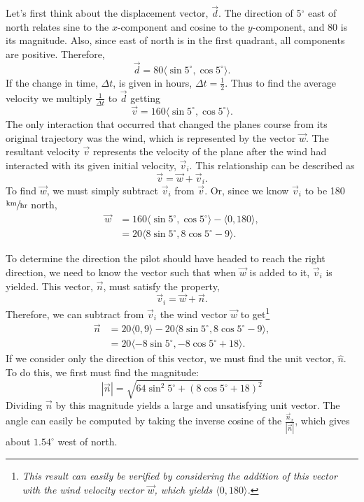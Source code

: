 \documentclass{article}
\begin{document}
Let's first think about the displacement vector, $\vec{d}$. The direction of 5$^\circ$ east of north relates sine to the $x$-component and cosine to the $y$-component, and 80 is its magnitude. Also, since east of north is in the first quadrant, all components are positive. Therefore,
\[
    \vec{d}=80\langle \sin 5^\circ, \cos 5^\circ \rangle.
\]
If the change in time, $\Delta t$, is given in hours, $\Delta t = \frac{1}{2}$. Thus to find the average velocity we multiply $\frac{1}{\Delta t}$ to $\vec{d}$ getting
\[
    \vec{v}=160\langle \sin 5^\circ, \cos 5^\circ \rangle.
\]
The only interaction that occurred that changed the planes course from its original trajectory was the wind, which is represented by the vector $\vec{w}$. The resultant velocity $\vec{v}$ represents the velocity of the plane after the wind had interacted with its given initial velocity, $\vec{v}_i$. This relationship can be described as
\[
    \vec{v}=\vec{w}+\vec{v}_i.  
\]
To find $\vec{w}$, we must simply subtract $\vec{v}_i$ from $\vec{v}$. Or, since we know $\vec{v}_i$ to be 180 $\sfrac{\text{km}}{\text{hr}}$ north,
\[
\begin{split}
    \vec{w}&=160\langle \sin 5^\circ, \cos 5^\circ \rangle - \langle 0, 180 \rangle, \\
           &=20\langle 8 \sin 5^\circ, 8\cos 5^\circ - 9 \rangle.
\end{split}
\]

To determine the direction the pilot should have headed to reach the right direction, we need to know the vector such that when $\vec{w}$ is added to it, $\vec{v}_i$ is yielded. This vector, $\vec{n}$, must satisfy the property,
\[
    \vec{v}_i=\vec{w}+\vec{n}.
\]
Therefore, we can subtract from $\vec{v}_i$ the wind vector $\vec{w}$ to get\footnote{\textit{This result can easily be verified by considering the addition of this vector with the wind velocity vector $\vec{w}$, which yields $\langle 0, 180 \rangle$.}}
\[
\begin{split}
    \vec{n}&=20\langle 0, 9 \rangle - 20\langle 8 \sin 5^\circ, 8\cos 5^\circ - 9 \rangle, \\
           &=20\langle -8 \sin 5^\circ, -8 \cos 5^\circ + 18 \rangle.
\end{split}
\]
If we consider only the direction of this vector, we must find the unit vector, $\hat{n}$. To do this, we first must find the magnitude:
\[
    |\vec{n}|=\sqrt{64\sin^2 5^\circ + (8\cos 5^\circ + 18)^2}  
\]
Dividing $\vec{n}$ by this magnitude yields a large and unsatisfying unit vector. The angle can easily be computed by taking the inverse cosine of the $\frac{\vec{n}_x}{|\vec{n}|}$, which gives about $1.54^\circ$ west of north.
\end{document}

